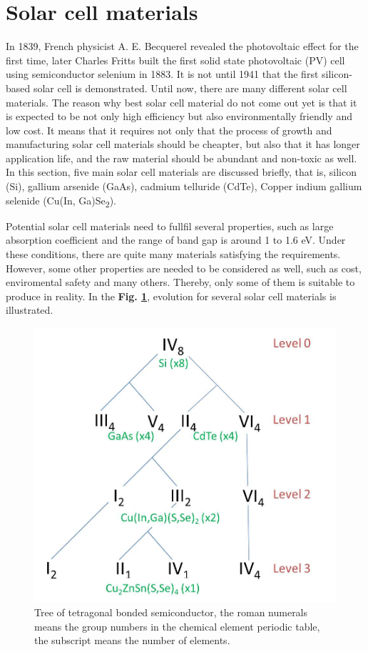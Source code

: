 \documentclass[a4paper, 12pt, titlepage,oneside,drop]{kthesis}
\begin{document}
\section{Solar cell materials}

In 1839,  French physicist A. E. Becquerel revealed the photovoltaic effect for the first time, later Charles Fritts built the first solid state photovoltaic (PV) cell using semiconductor selenium in 1883.
It is not until 1941 that the first silicon-based solar cell is demonstrated. Until now, there are many different solar cell materials. The reason why 
best solar cell material do not come out yet is that it is expected to be not only high efficiency but also environmentally friendly and 
low cost. It means that it requires not only that the process of growth and manufacturing solar cell materials should be cheapter, but also that it has longer application life, and the raw material should be abundant and non-toxic as well. In this section,
five main solar cell materials are discussed briefly, that is, silicon (Si), gallium arsenide (GaAs), cadmium telluride (CdTe), Copper indium gallium selenide (Cu(In, Ga)Se\textsubscript{2}).

Potential solar cell materials need to fullfil several properties, such as large absorption coefficient and the range of band gap is around 1 to 1.6 eV. Under these conditions, there 
are quite many materials satisfying the requirements. However, some other properties are needed to be considered as well, such as cost, enviromental safety
and many others. Thereby, only some of them is suitable to produce in reality. In the \textbf{Fig. \ref{lscm}}, evolution for several solar cell materials is illustrated. 

\begin{figure}[H]
\centering
\includegraphics[scale=0.5]{tree.jpg} 
\caption{Tree of tetragonal bonded semiconductor, the roman numerals means the group numbers in the chemical element periodic table, the subscript means the number of elements.}
\label{lscm}
\end{figure}
\end{document}
